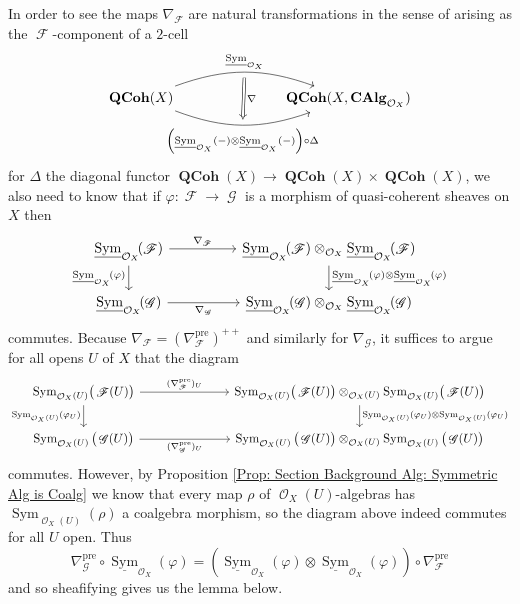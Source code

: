 \documentclass{amsart}
\theoremstyle{definition}
\DeclareMathOperator{\Fscr}{\mathscr{F}}
\DeclareMathOperator{\Gscr}{\mathscr{G}}
\DeclareMathOperator{\Ocal}{\mathcal{O}}
\DeclareMathOperator{\sym}{Sym}
\newcommand{\CAlg}[1]{\mathbf{CAlg}_{#1}}
\newcommand{\Sym}[1]{\sym_{#1}}
\newcommand{\RelSym}[1]{\underline{\sym}_{{#1}}}
\DeclareMathOperator{\QCoh}{\mathbf{QCoh}}
\numberwithin{equation}{subsection}
\begin{document}
In order to see the maps $\nabla_{\Fscr}$ are natural transformations in the sense of arising as the $\Fscr$-component of a $2$-cell
\[
\begin{tikzcd}
\QCoh(X) \ar[rrr, bend left = 20, ""{name = U}]{}{\RelSym{\Ocal_X}} \ar[rrr, swap, bend right = 20, ""{name = D}]{}{\left(\RelSym{\Ocal_X}(-) \otimes \RelSym{\Ocal_X}(-)\right) \circ \Delta} & & & \QCoh(X,\CAlg{\Ocal_X})
\ar[from = U, to = D, Rightarrow, shorten <= 4pt, shorten >= 4pt]{}{\nabla}
\end{tikzcd}
\]
for $\Delta$ the diagonal functor $\QCoh(X) \to \QCoh(X) \times \QCoh(X)$, we also need to know that if $\varphi:\Fscr \to \Gscr$ is a morphism of quasi-coherent sheaves on $X$ then 
\[
\begin{tikzcd}
\RelSym{\Ocal_X}\!(\Fscr) \ar[d, swap]{}{\RelSym{\Ocal_X}\!(\varphi)} \ar[rr]{}{\nabla_{\Fscr}} & & \RelSym{\Ocal_X}\!(\Fscr) \otimes_{\Ocal_X} \RelSym{\Ocal_X}\!(\Fscr) \ar[d]{}{\RelSym{\Ocal_X}\!(\varphi) \otimes \RelSym{\Ocal_X}\!(\varphi)} \\
\RelSym{\Ocal_X}\!(\Gscr) \ar[rr, swap]{}{\nabla_{\Gscr}} & & \RelSym{\Ocal_X}\!(\Gscr)\otimes_{\Ocal_X} \RelSym{\Ocal_X}\!(\Gscr)
\end{tikzcd}
\]
commutes. Because $\nabla_{\Fscr} = (\nabla_{\Fscr}^{\operatorname{pre}})^{++}$ and similarly for $\nabla_{\Gscr}$, it suffices to argue for all opens $U$ of $X$ that the diagram
\[
\begin{tikzcd}
\Sym{\Ocal_X(U)}\!\big(\Fscr(U)\big) \ar[rrr]{}{(\nabla_{\Fscr}^{\operatorname{pre}})_U} \ar[d, swap]{}{\Sym{\Ocal_X(U)}(\varphi_U)} & & & \Sym{\Ocal_X(U)}\!\big(\Fscr(U)\big) \otimes_{\Ocal_X(U)} \Sym{\Ocal_X(U)}\!\big(\Fscr(U)\big) \ar[d]{}{\Sym{\Ocal_X(U)}(\varphi_U) \otimes \Sym{\Ocal_X(U)}(\varphi_U)} \\
\Sym{\Ocal_X(U)}\big(\Gscr(U)\big) \ar[rrr, swap]{}{(\nabla_{\Gscr}^{\operatorname{pre}})_U} & & & \Sym{\Ocal_X(U)}\big(\Gscr(U)\big) \otimes_{\Ocal_X(U)} \Sym{\Ocal_X(U)}\big(\Gscr(U)\big)
\end{tikzcd}
\]
commutes. However, by Proposition \ref{Prop: Section Background Alg: Symmetric Alg is Coalg} we know that every map $\rho$ of $\Ocal_X(U)$-algebras has $\Sym{\Ocal_X(U)}(\rho)$ a coalgebra morphism, so the diagram above indeed commutes for all $U$ open. Thus 
\[
\nabla_{\Gscr}^{\operatorname{pre}} \circ \RelSym{\Ocal_X}\!(\varphi) = \left(\RelSym{\Ocal_X}\!(\varphi) \otimes \RelSym{\Ocal_X}\!(\varphi)\right) \circ \nabla_{\Fscr}^{\operatorname{pre}}
\]
and so sheafifying gives us the lemma below.
\end{document}
